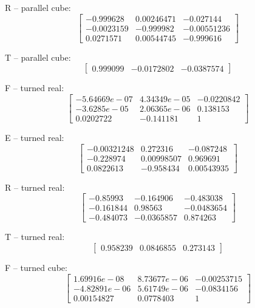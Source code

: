 R -- parallel cube: 
\begin{equation*}
\begin{bmatrix}
-0.999628 & 0.00246471 & -0.027144 \\ -0.0023159 & -0.999982 & -0.00551236 \\ 0.0271571 & 0.00544745 & -0.999616
\end{bmatrix}
\end{equation*}

T -- parallel cube: 
\begin{equation*}
\begin{bmatrix}
0.999099 & -0.0172802 & -0.0387574
\end{bmatrix}
\end{equation*}

F -- turned real: 
\begin{equation*}
\begin{bmatrix}
-5.64669e-07 & 4.34349e-05 & -0.0220842 \\ -3.6285e-05 & 2.06365e-06 & 0.138153 \\ 0.0202722 & -0.141181 & 1
\end{bmatrix}
\end{equation*}

E -- turned real: 
\begin{equation*}
\begin{bmatrix}
-0.00321248 & 0.272316 & -0.087248 \\ -0.228974 & 0.00998507 & 0.969691 \\ 0.0822613 & -0.958434 & 0.00543935
\end{bmatrix}
\end{equation*}

R -- turned real: 
\begin{equation*}
\begin{bmatrix}
-0.85993 & -0.164906 & -0.483038 \\ -0.161844 & 0.98563 & -0.0483654 \\ -0.484073 & -0.0365857 & 0.874263
\end{bmatrix}
\end{equation*}

T -- turned real: 
\begin{equation*}
\begin{bmatrix}
0.958239 & 0.0846855 & 0.273143
\end{bmatrix}
\end{equation*}

F -- turned cube: 
\begin{equation*}
\begin{bmatrix}
1.69916e-08 & 8.73677e-06 & -0.00253715 \\ -4.82891e-06 & 5.61749e-06 & -0.0834156 \\ 0.00154827 & 0.0778403 & 1
\end{bmatrix}
\end{equation*}

